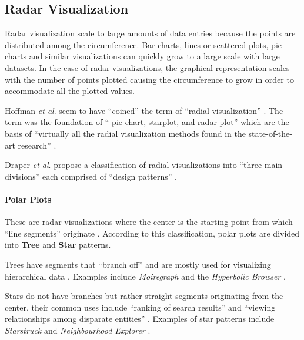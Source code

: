 \documentclass[twocolumn]{bmcart}%
\begin{document}
\subsection*{Radar Visualization}


Radar visualization scale to large amounts of data entries because the points are distributed among the circumference. Bar charts, lines or scattered plots, pie charts and similar visualizations can quickly grow to a large scale with large datasets. In the case of radar visualizations, the graphical representation scales with the number of points plotted causing the circumference to grow in order to accommodate all the plotted values. 


Hoffman \textit{et al}. seem to have ``coined'' the term of ``radial visualization'' \cite{hoffman1997dna, draper2009survey}. The term was the foundation of `` pie chart, starplot, and radar plot'' which are the basis of ``virtually all the radial visualization methods found in the state-of-the-art research'' \cite{draper2009survey}.

Draper \textit{et al}. propose a classification of radial visualizations into ``three main divisions'' each comprised of ``design patterns'' \cite{draper2009survey}.

\paragraph*{Polar Plots}
These are radar visualizations where the center is the starting point from which ``line segments'' originate \cite{draper2009survey}. According to this classification, polar plots are divided into \textbf{Tree} and \textbf{Star} patterns.

Trees have segments that ``branch off'' and are mostly used for visualizing hierarchical data \cite{draper2009survey}. Examples include \textit{Moiregraph} \cite{draper2009survey, jankun2003moiregraphs} and the \textit{Hyperbolic Browser} \cite{draper2009survey, lamping1996hyperbolic}.

Stars do not have branches but rather straight segments originating from the center, their common uses include ``ranking of search results'' and ``viewing relationships among disparate entities'' \cite{draper2009survey}. Examples of star patterns include  \textit{Starstruck} \cite{draper2009survey, hetzler1998multi} and \textit{Neighbourhood Explorer} \cite{draper2009survey, Spence2001Information}.
\end{document}
